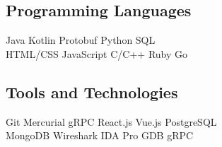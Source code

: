 \documentclass[]{template}
\begin{document}
\begin{minipage}[t]{.45\textwidth}
\subsection{Programming Languages}
Java
\textbullet{} Kotlin
\textbullet{} Protobuf
\textbullet{} Python
\textbullet{} SQL
\\ %
HTML/CSS
\textbullet{} JavaScript
\textbullet{} C/C++
\textbullet{} Ruby
\textbullet{} Go
\sectionsep
\end{minipage} \hfill \begin{minipage}[t]{.45\textwidth}
\subsection{Tools and Technologies}
Git
\textbullet{} Mercurial
\textbullet{} gRPC
\textbullet{} React.js
\textbullet{} Vue.js
\textbullet{} PostgreSQL
\\ %
MongoDB
\textbullet{} Wireshark
\textbullet{} IDA Pro
\textbullet{} GDB
\textbullet{} gRPC
\end{minipage}
\end{document}
